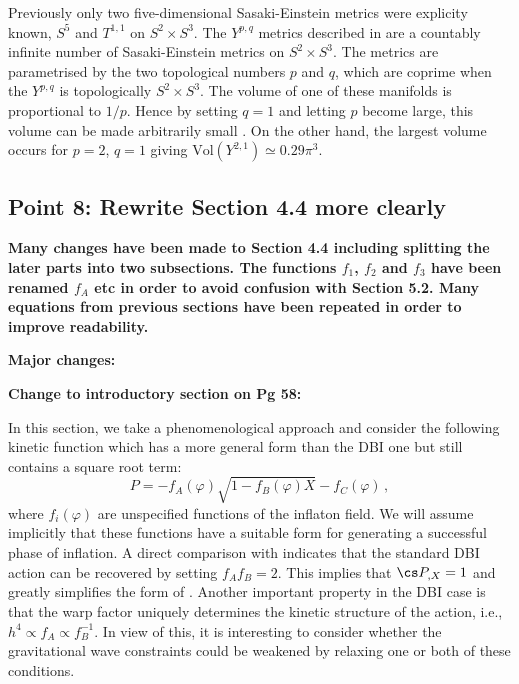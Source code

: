 Previously only two five-dimensional Sasaki-Einstein
metrics were explicity known, $S^5$ and $T^{1,1}$ on $S^2\times S^3$. The $Y^{p,q}$ metrics
described in  are a countably infinite number of Sasaki-Einstein metrics on
$S^2\times S^3$. The metrics are parametrised by the two topological numbers $p$ and $q$, which are
coprime when the $Y^{p,q}$ is topologically $S^2\times S^3$. The volume of one of these manifolds
is proportional to $1/p$. Hence by setting $q=1$ and letting $p$ become large, this volume can be
made arbitrarily small \cite{gauntlett}. On the other hand, the largest volume occurs for $p=2$,
$q=1$ giving $\mathrm{Vol}(Y^{2,1})\simeq 0.29\pi^3$. 

\subsection{Point 8: Rewrite Section 4.4 more clearly}
\textbf{Many changes have been made to Section 4.4 including splitting the later parts into two
subsections. The functions $f_1$, $f_2$ and $f_3$ have been renamed $f_A$ etc in order to avoid
confusion with Section 5.2. Many equations from previous sections have been repeated in order to
improve readability.}

\textbf{Major changes:}

\textbf{Change to introductory section on Pg 58:}

In this section, we take a phenomenological 
approach and consider the following kinetic function which has a more general form than the DBI one
but still contains a square root term:
% 
\begin{equation}
\label{eq:genaction-corr}
P= -f_A (\varphi ) \sqrt{1-f_B (\varphi ) X} -f_C (\varphi) \,,
\end{equation}
% 
where $f_i (\varphi )$ are unspecified functions of the inflaton 
field. We will assume 
implicitly that these functions have a suitable form for 
generating a successful phase of inflation.
A direct comparison with  
indicates that the standard DBI action can be recovered by setting $f_A f_B =2$. This implies
that $\cs P_{,X} =1$ and greatly simplifies the form of . 
Another important property in the DBI case is that the warp factor uniquely determines 
the kinetic structure of the action, i.e., $h^4 \propto f_A \propto f_B^{-1}$.  
In view of this, it is interesting to consider whether
the gravitational wave constraints could be weakened by relaxing one 
or both of these conditions. 

